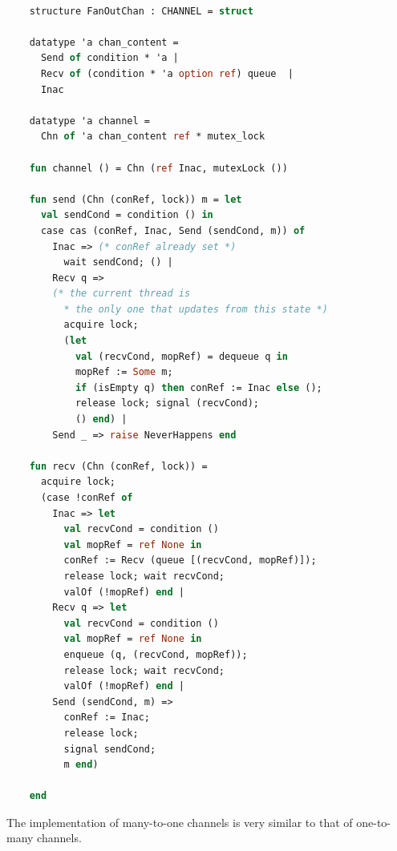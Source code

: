 \documentclass{article}
\begin{document}
  \begin{lstlisting}[language=ML, mathescape]

    structure FanOutChan : CHANNEL = struct

    datatype 'a chan_content =
      Send of condition * 'a |
      Recv of (condition * 'a option ref) queue  |
      Inac

    datatype 'a channel =
      Chn of 'a chan_content ref * mutex_lock

    fun channel () = Chn (ref Inac, mutexLock ())

    fun send (Chn (conRef, lock)) m = let
      val sendCond = condition () in
      case cas (conRef, Inac, Send (sendCond, m)) of
        Inac => (* conRef already set *)
          wait sendCond; () |
        Recv q => 
        (* the current thread is
          * the only one that updates from this state *)
          acquire lock;
          (let
            val (recvCond, mopRef) = dequeue q in
            mopRef := Some m; 
            if (isEmpty q) then conRef := Inac else (); 
            release lock; signal (recvCond);
            () end) |
        Send _ => raise NeverHappens end

    fun recv (Chn (conRef, lock)) =
      acquire lock;
      (case !conRef of
        Inac => let
          val recvCond = condition ()
          val mopRef = ref None in
          conRef := Recv (queue [(recvCond, mopRef)]);
          release lock; wait recvCond;
          valOf (!mopRef) end |
        Recv q => let
          val recvCond = condition () 
          val mopRef = ref None in
          enqueue (q, (recvCond, mopRef));
          release lock; wait recvCond;
          valOf (!mopRef) end |
        Send (sendCond, m) =>
          conRef := Inac;
          release lock;
          signal sendCond;
          m end) 

    end 
  \end{lstlisting}

The implementation of many-to-one channels is very similar to that of one-to-many channels.
\end{document}
